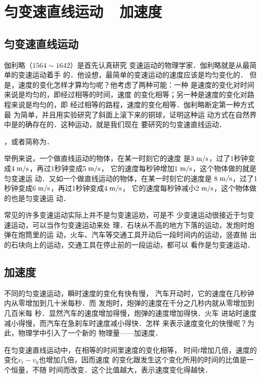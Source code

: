 \section{匀变速直线运动~~加速度}
    \subsection{匀变速直线运动}
    
    伽利略（$1564 \sim 1642$）是首先认真研究
变速运动的物理学家．伽利略就是从最简单的变速运动着手
的．他设想，最简单的变速运动的速度应该是均匀变化的．
但是，速度的变化怎样才算均匀呢？他考虑了两种可能：一种
是速度的变化对时间来说是均匀的，即经过相等的时间，速度
的变化相等；另一种是速度的变化对路程来说是均匀的，即
经过相等的路程，速度的变化相等．伽利略断定第一种方式最
为简单，并且用实验研究了斜面上滚下来的铜球，证明这种运
动方式在自然界中是的确存在的．这种运动，就是我们现在
要研究的匀变速直线运动．

，或者简称为．

举例来说，一个做直线运动的物体，在某一时刻它的速度
是3$\;\text{m}/\text{s}$，过了1秒钟变成4$\;\text{m}/\text{s}$，再过1秒钟变成5$\;\text{m}/\text{s}$，
它的速度每秒钟增加1$\;\text{m}/\text{s}$，这个物体做的就是匀变速运
动．又如一个做直线运动的物体，在某一时刻它的速度是
8$\;\text{m}/\text{s}$，过了1秒钟变成6$\;\text{m}/\text{s}$，再过1秒钟变成4$\;\text{m}/\text{s}$，
它的速度每秒钟减小2$\;\text{m}/\text{s}$，这个物体做的也是匀变速运
动．

    常见的许多变速运动实际上并不是匀变速运劝，可是不
少变速运动很接近于匀变速运动，可以当作匀变速运动来处
理．石块从不高的地方下落的运动，发炮时炮弹在炮筒里的运
动，火车、汽车等交通工具开动后一段时间内的运动，竖直抛
出的石块向上的运动，交通工具在停止前的一段运动，都可以
看作是匀变速运动．

\subsection{加速度}
不同的匀变速运动，瞬时速度的变化有快有慢，
汽车开动时，它的速度在几秒钟内从零增加到几十米每秒．而
发炮时，炮弹的速度在千分之几秒内就从零增加到几百米每
秒．显然汽车的速度增加得慢，炮弹的速度增加得快．火车
进站时速度减小得慢，而汽车在急刹车时速度减小得快．怎样
来表示速度变化的快慢呢？为此，物理学中引入了一个新的
物理量——加速度．

在匀变速直线运动中，在相等的时间里速度的变化相等，
时间$t$增加几倍，速度的变化$v_t-v_0$也增加几倍，因而速度
的变化跟发生这个变化所用的时间的比值是一个恒量，不随
时间而改变．这个比值越大，表示速度变化得越快．

